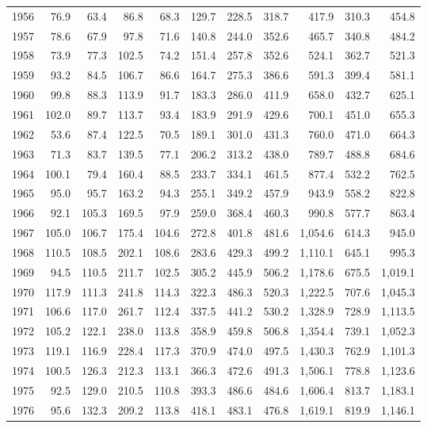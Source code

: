 \begin{longtable}{r*{10}{r}}
1956 & 76.9 & 63.4 & 86.8 & 68.3 & 129.7 & 228.5 & 318.7 & 417.9 & 310.3 & 454.8 \\
1957 & 78.6 & 67.9 & 97.8 & 71.6 & 140.8 & 244.0 & 352.6 & 465.7 & 340.8 & 484.2 \\
1958 & 73.9 & 77.3 & 102.5 & 74.2 & 151.4 & 257.8 & 352.6 & 524.1 & 362.7 & 521.3 \\
1959 & 93.2 & 84.5 & 106.7 & 86.6 & 164.7 & 275.3 & 386.6 & 591.3 & 399.4 & 581.1 \\
1960 & 99.8 & 88.3 & 113.9 & 91.7 & 183.3 & 286.0 & 411.9 & 658.0 & 432.7 & 625.1 \\
1961 & 102.0 & 89.7 & 113.7 & 93.4 & 183.9 & 291.9 & 429.6 & 700.1 & 451.0 & 655.3 \\
1962 & 53.6 & 87.4 & 122.5 & 70.5 & 189.1 & 301.0 & 431.3 & 760.0 & 471.0 & 664.3 \\
1963 & 71.3 & 83.7 & 139.5 & 77.1 & 206.2 & 313.2 & 438.0 & 789.7 & 488.8 & 684.6 \\
1964 & 100.1 & 79.4 & 160.4 & 88.5 & 233.7 & 334.1 & 461.5 & 877.4 & 532.2 & 762.5 \\
1965 & 95.0 & 95.7 & 163.2 & 94.3 & 255.1 & 349.2 & 457.9 & 943.9 & 558.2 & 822.8 \\
1966 & 92.1 & 105.3 & 169.5 & 97.9 & 259.0 & 368.4 & 460.3 & 990.8 & 577.7 & 863.4 \\
1967 & 105.0 & 106.7 & 175.4 & 104.6 & 272.8 & 401.8 & 481.6 & 1,054.6 & 614.3 & 945.0 \\
1968 & 110.5 & 108.5 & 202.1 & 108.6 & 283.6 & 429.3 & 499.2 & 1,110.1 & 645.1 & 995.3 \\
1969 & 94.5 & 110.5 & 211.7 & 102.5 & 305.2 & 445.9 & 506.2 & 1,178.6 & 675.5 & 1,019.1 \\
1970 & 117.9 & 111.3 & 241.8 & 114.3 & 322.3 & 486.3 & 520.3 & 1,222.5 & 707.6 & 1,045.3 \\
1971 & 106.6 & 117.0 & 261.7 & 112.4 & 337.5 & 441.2 & 530.2 & 1,328.9 & 728.9 & 1,113.5 \\
1972 & 105.2 & 122.1 & 238.0 & 113.8 & 358.9 & 459.8 & 506.8 & 1,354.4 & 739.1 & 1,052.3 \\
1973 & 119.1 & 116.9 & 228.4 & 117.3 & 370.9 & 474.0 & 497.5 & 1,430.3 & 762.9 & 1,101.3 \\
1974 & 100.5 & 126.3 & 212.3 & 113.1 & 366.3 & 472.6 & 491.3 & 1,506.1 & 778.8 & 1,123.6 \\
1975 & 92.5 & 129.0 & 210.5 & 110.8 & 393.3 & 486.6 & 484.6 & 1,606.4 & 813.7 & 1,183.1 \\
1976 & 95.6 & 132.3 & 209.2 & 113.8 & 418.1 & 483.1 & 476.8 & 1,619.1 & 819.9 & 1,146.1 \\

\end{longtable}
